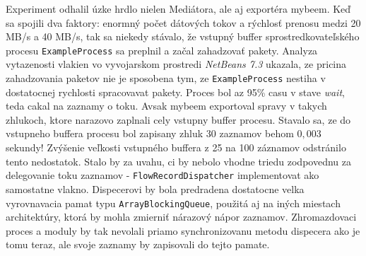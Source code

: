 Experiment odhalil úzke hrdlo nielen Mediátora, ale aj exportéra mybeem. Keď sa spojili dva faktory: 
enormný počet dátových tokov a rýchlosť prenosu medzi 20 MB/s a 40 MB/s, tak sa niekedy stávalo, že vstupný 
buffer sprostredkovateľského procesu \verb|ExampleProcess| sa preplnil a začal zahadzovať pakety. 
Analyza vytazenosti vlakien vo vyvojarskom prostredi \emph{NetBeans 7.3} ukazala, ze pricina zahadzovania 
paketov nie je sposobena tym, ze \verb|ExampleProcess| nestiha v dostatocnej rychlosti spracovavat pakety.
Proces bol az 95\% casu v stave \emph{wait}, teda cakal na zaznamy o toku. Avsak mybeem exportoval spravy
v takych zhlukoch, ktore narazovo zaplnali cely vstupny buffer procesu. Stavalo sa, ze do vstupneho
buffera procesu bol zapisany zhluk 30 zaznamov behom $0,003$ sekundy!
%
Zvýšenie veľkosti vstupného buffera z 25 na 100 záznamov odstránilo tento nedostatok. Stalo by za uvahu,
ci by nebolo vhodne triedu zodpovednu za delegovanie toku zaznamov - \verb|FlowRecordDispatcher| 
implementovat ako samostatne vlakno. Dispecerovi by bola predradena dostatocne velka vyrovnavacia pamat 
typu \verb|ArrayBlockingQueue|, použitá aj na iných miestach architektúry, ktorá by mohla zmierniť 
nárazový nápor zaznamov. Zhromazdovaci proces a moduly by tak nevolali priamo synchronizovanu metodu
dispecera ako je tomu teraz, ale svoje zaznamy by zapisovali do tejto pamate.

